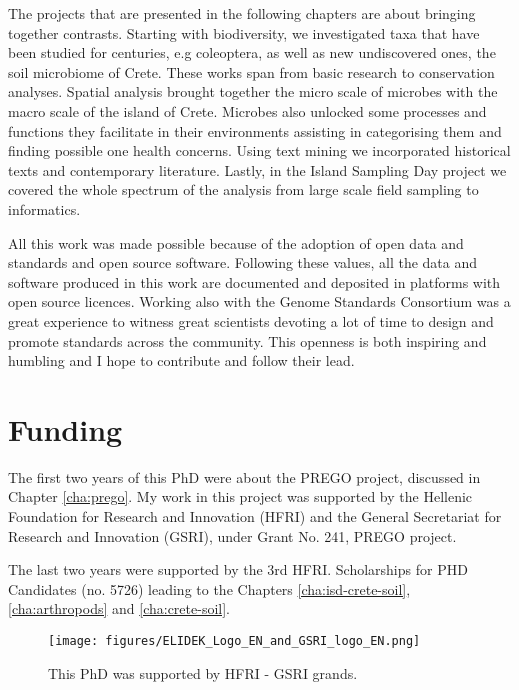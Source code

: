 \documentclass[
11pt, %
english, %
singlespacing, %
toctotoc, %
headsepline, %
]{MastersDoctoralThesis} %
\begin{document}
The projects that are presented in the following chapters are about 
bringing together contrasts. Starting with biodiversity, we investigated taxa that 
have been studied for centuries, e.g coleoptera, as well as new undiscovered ones, the soil microbiome of 
Crete. These works span from basic research to conservation analyses. 
Spatial analysis brought together the micro scale of microbes with the macro
scale of the island of Crete.
Microbes also unlocked some processes and functions they facilitate in their environments assisting in
categorising them and finding possible one health concerns.
Using text mining we incorporated historical texts and contemporary literature.
Lastly, in the Island Sampling Day project we covered
the whole spectrum of the analysis from large scale field sampling to informatics.

All this work was made possible because of the adoption of open data and standards
and open source software. Following these values, all the data and software produced
in this work are documented and deposited in platforms with open source licences. 
Working also with the Genome Standards Consortium was a great experience to witness
great scientists devoting a lot of time to design and promote standards across the 
community. This openness is both inspiring and humbling and I hope to contribute and follow 
their lead.

\chapter*{Funding}

The first two years of this PhD were about the PREGO project, discussed in Chapter \ref{cha:prego}. My work in this 
project was supported by the Hellenic Foundation for Research and
Innovation (HFRI) and the General Secretariat for Research and Innovation (GSRI),
under Grant No. 241, PREGO project.

The last two years were supported by the 3rd HFRI. Scholarships for PHD
Candidates (no. 5726) leading to the Chapters \ref{cha:isd-crete-soil}, \ref{cha:arthropods} and \ref{cha:crete-soil}.

   \begin{figure}[h]
      \centering
      \texttt{[image: figures/ELIDEK\_Logo\_EN\_and\_GSRI\_logo\_EN.png]}
      \caption[HFRI and GSRI funding]{
          This PhD was supported by HFRI - GSRI grands. 
      }
      \label{fig:hfri_logo}
   \end{figure}
\end{document}
